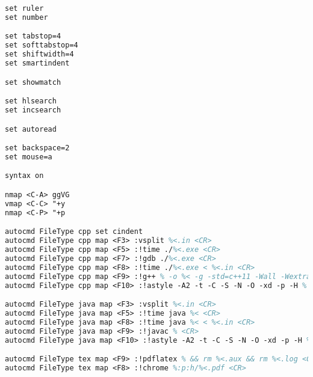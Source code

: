 \begin{lstlisting}[language=tex,identifierstyle=\color{black},commentstyle=\color{black}]
set ruler
set number

set tabstop=4
set softtabstop=4
set shiftwidth=4
set smartindent

set showmatch

set hlsearch
set incsearch

set autoread

set backspace=2
set mouse=a

syntax on

nmap <C-A> ggVG
vmap <C-C> "+y
nmap <C-P> "+p

autocmd FileType cpp set cindent
autocmd FileType cpp map <F3> :vsplit %<.in <CR>
autocmd FileType cpp map <F5> :!time ./%<.exe <CR>
autocmd FileType cpp map <F7> :!gdb ./%<.exe <CR>
autocmd FileType cpp map <F8> :!time ./%<.exe < %<.in <CR>
autocmd FileType cpp map <F9> :!g++ % -o %< -g -std=c++11 -Wall -Wextra -Wconversion && size %<.exe <CR>
autocmd FileType cpp map <F10> :!astyle -A2 -t -C -S -N -O -xd -p -H % <CR>

autocmd FileType java map <F3> :vsplit %<.in <CR>
autocmd FileType java map <F5> :!time java %< <CR>
autocmd FileType java map <F8> :!time java %< < %<.in <CR>
autocmd FileType java map <F9> :!javac % <CR>
autocmd FileType java map <F10> :!astyle -A2 -t -C -S -N -O -xd -p -H % <CR>

autocmd FileType tex map <F9> :!pdflatex % && rm %<.aux && rm %<.log <CR>
autocmd FileType tex map <F8> :!chrome %:p:h/%<.pdf <CR>
\end{lstlisting}

